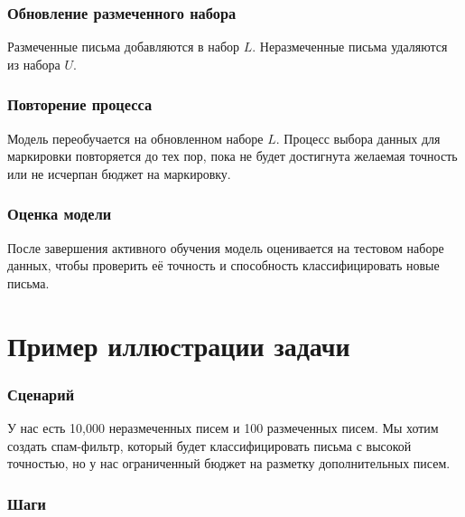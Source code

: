 \documentclass{article}
\begin{document}
\subsubsection*{Обновление размеченного набора}

Размеченные письма добавляются в набор \(L\). Неразмеченные письма удаляются из набора \(U\).

\subsubsection*{Повторение процесса}

Модель переобучается на обновленном наборе \(L\). Процесс выбора данных для маркировки повторяется до тех пор, пока не будет достигнута желаемая точность или не исчерпан бюджет на маркировку.

\subsubsection*{Оценка модели}

После завершения активного обучения модель оценивается на тестовом наборе данных, чтобы проверить её точность и способность классифицировать новые письма.

\section*{Пример иллюстрации задачи}

\subsubsection*{Сценарий}

У нас есть 10,000 неразмеченных писем и 100 размеченных писем. Мы хотим создать спам-фильтр, который будет классифицировать письма с высокой точностью, но у нас ограниченный бюджет на разметку дополнительных писем.

\subsubsection*{Шаги}
\end{document}
